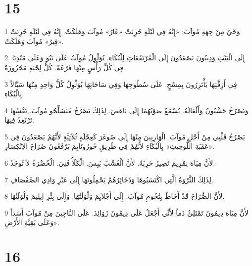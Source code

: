 \chapter{15}

\par 1 وَحْيٌ مِنْ جِهَةِ مُوآبَ: «إِنَّهُ فِي لَيْلَةٍ خَرِبَتْ «عَارُ» مُوآبَ وَهَلَكَتْ. إِنَّهُ فِي لَيْلَةٍ خَرِبَتْ «قِيرُ» مُوآبَ وَهَلَكَتْ.
\par 2 إِلَى الْبَيْتِ وَدِيبُونَ يَصْعَدُونَ إِلَى الْمُرْتَفَعَاتِ لِلْبُكَاءِ. تُوَلْوِلُ مُوآبُ عَلَى نَبُو وَعَلَى مَيْدِبَا. فِي كُلِّ رَأْسٍ مِنْهَا قَرْعَةٌ. كُلُّ لِحْيَةٍ مَجْزُوزَةٌ.
\par 3 فِي أَزِقَّتِهَا يَأْتَزِرُونَ بِمِسْحٍ. عَلَى سُطُوحِهَا وَفِي سَاحَاتِهَا يُوَلْوِلُ كُلُّ وَاحِدٍ مِنْهَا سَيَّالاً بِالْبُكَاءِ.
\par 4 وَتَصْرُخُ حَشْبُونُ وَأَلْعَالَةُ. يُسْمَعُ صَوْتُهُمَا إِلَى يَاهَصَ. لِذَلِكَ يَصْرُخُ مُتَسَلِّحُو مُوآبَ. نَفْسُهَا تَرْتَعِدُ فِيهَا.
\par 5 يَصْرُخُ قَلْبِي مِنْ أَجْلِ مُوآبَ. الْهَارِبِينَ مِنْهَا إِلَى صُوغَرَ كَعِجْلَةٍ ثُلاَثِيَّةٍ لأَنَّهُمْ يَصْعَدُونَ فِي «عَقَبَةِ اللُّوحِيثِ» بِالْبُكَاءِ لأَنَّهُمْ فِي طَرِيقِ حُورُونَايِمَ يَرْفَعُونَ صُرَاخَ الاِنْكِسَارِ.
\par 6 لأَنَّ مِيَاهَ نِمْرِيمَ تَصِيرُ خَرِبَةً. لأَنَّ الْعُشْبَ يَبِسَ. الْكَلَأُ فَنِيَ. الْخُضْرَةُ لاَ تُوجَدُ.
\par 7 لِذَلِكَ الثَّرْوَةُ الَّتِي اكْتَسَبُوهَا وَذَخَائِرُهُمْ يَحْمِلُونَهَا إِلَى عَبْرِ وَادِي الصَّفْصَافِ.
\par 8 لأَنَّ الصُّرَاخَ قَدْ أَحَاطَ بِتُخُومِ مُوآبَ. إِلَى أَجْلاَيِمَ وَلْوَلَتُهَا. وَإِلَى بِئْرِ إِيلِيمَ وَلْوَلَتُهَا.
\par 9 لأَنَّ مِيَاهَ دِيمُونَ تَمْتَلِئُ دَماً لأَنِّي أَجْعَلُ عَلَى دِيمُونَ زَوَائِدَ. عَلَى النَّاجِينَ مِنْ مُوآبَ أَسَداً وَعَلَى بَقِيَّةِ الأَرْضِ».

\chapter{16}

